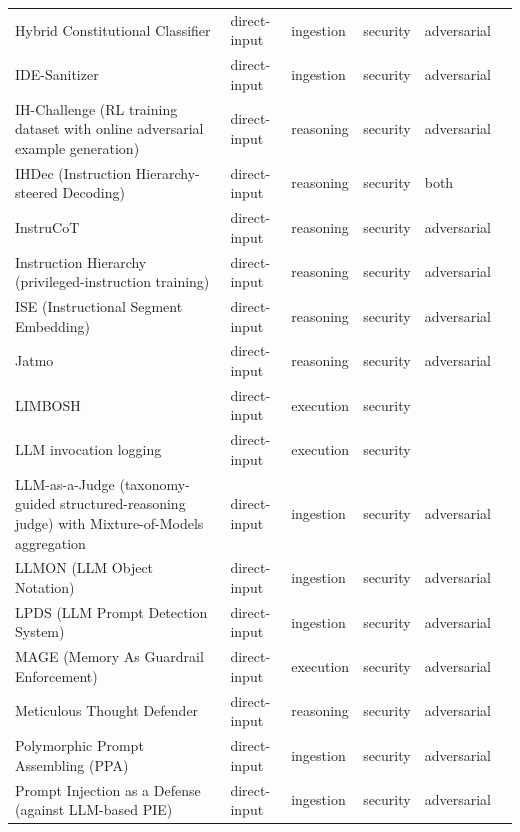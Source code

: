 \begin{longtable}{@{}>{\raggedright\arraybackslash}p{}lllll@{}}
Hybrid Constitutional Classifier & direct-input & ingestion & security & adversarial & \cite{lan-2025-hybrid} \\
IDE-Sanitizer & direct-input & ingestion & security & adversarial & \cite{nkoro-2026-idesanitizer} \\
IH-Challenge (RL training dataset with online adversarial example generation) & direct-input & reasoning & security & adversarial & \cite{guo-2026-ihchallenge} \\
IHDec (Instruction Hierarchy-steered Decoding) & direct-input & reasoning & security & both & \cite{liu-2026-ihdec} \\
InstruCoT & direct-input & reasoning & security & adversarial & \cite{chang-2026-know} \\
Instruction Hierarchy (privileged-instruction training) & direct-input & reasoning & security & adversarial & \cite{wallace-2024-instruction} \\
ISE (Instructional Segment Embedding) & direct-input & reasoning & security & adversarial & \cite{wu-2024-instructional} \\
Jatmo & direct-input & reasoning & security & adversarial & \cite{piet-2023-jatmo} \\
LIMBOSH & direct-input & execution & security &  & \cite{johnson-2024-modular} \\
LLM invocation logging & direct-input & execution & security &  & \cite{chernyshev-2023-large} \\
LLM-as-a-Judge (taxonomy-guided structured-reasoning judge) with Mixture-of-Models aggregation & direct-input & ingestion & security & adversarial & \cite{le-2026-prompt} \\
LLMON (LLM Object Notation) & direct-input & ingestion & security & adversarial & \cite{hind-2026-llmon} \\
LPDS (LLM Prompt Detection System) & direct-input & ingestion & security & adversarial & \cite{kim-2024-protection} \\
MAGE (Memory As Guardrail Enforcement) & direct-input & execution & security & adversarial & \cite{wang-2026-mage} \\
Meticulous Thought Defender & direct-input & reasoning & security & adversarial & \cite{shi-2025-meticulous} \\
Polymorphic Prompt Assembling (PPA) & direct-input & ingestion & security & adversarial & \cite{wang-2025-protect} \\
Prompt Injection as a Defense (against LLM-based PIE) & direct-input & ingestion & security & adversarial & \cite{liu-2024-evaluating} \\

\end{longtable}
